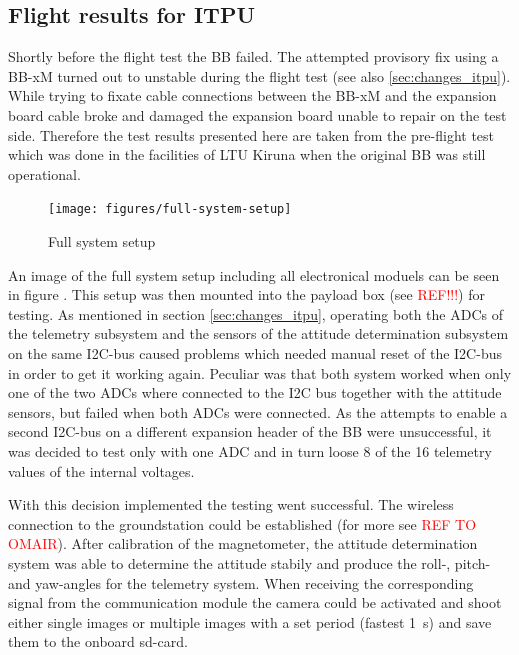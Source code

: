 \subsection{Flight results for ITPU}

Shortly before the flight test the BB failed. The attempted provisory fix using a BB-xM turned out to unstable during the flight test (see also \ref{sec:changes_itpu}). While trying to fixate cable connections between the BB-xM and the expansion board cable broke and damaged the expansion board unable to repair on the test side. Therefore the test results presented here are taken from the pre-flight test which was done in the facilities of LTU Kiruna when the original BB was still operational.

\begin{figure}
\centering
\texttt{[image: figures/full-system-setup]}
\caption{Full system setup}
\label{fig:FlightTest1_1}
\end{figure}

An image of the full system setup including all electronical moduels can be seen in figure . This setup was then mounted into the payload box (see \textcolor{red}{REF!!!}) for testing. As mentioned in section \ref{sec:changes_itpu}, operating both the ADCs of the telemetry subsystem and the sensors of the attitude determination subsystem on the same I2C-bus caused problems which needed manual reset of the I2C-bus in order to get it working again. Peculiar was that both system worked when only one of the two ADCs where connected to the I2C bus together with the attitude sensors, but failed when both ADCs were connected. As the attempts to enable a second I2C-bus on a different expansion header of the BB were unsuccessful, it was decided to test only with one ADC and in turn loose 8 of the 16 telemetry values of the internal voltages. 

With this decision implemented the testing went successful. The wireless connection to the groundstation could be established (for more see \textcolor{red}{REF TO OMAIR}). After calibration of the magnetometer, the attitude determination system was able to determine the attitude stabily and produce the roll-, pitch- and yaw-angles for the telemetry system. When receiving the corresponding signal from the communication module the camera could be activated and shoot either single images or multiple images with a set period (fastest 1~s) and save them to the onboard sd-card.  

